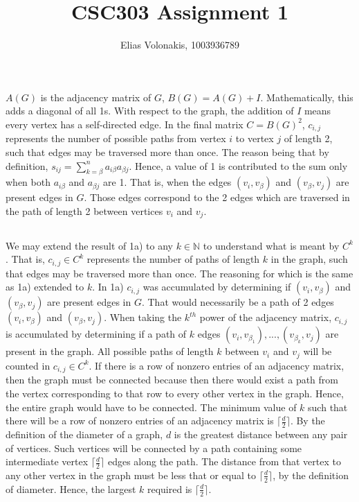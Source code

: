 \documentclass[12pt]{article}
\title{CSC303 Assignment 1}
\author{Elias Volonakis, 1003936789}
\begin{document}
\maketitle

\section{}
\subsection{}
$A(G)$ is the adjacency matrix of $G$, $B(G) = A(G) + I$. Mathematically, this adds a diagonal of all 1s. With respect to the graph, the addition of $I$ means every vertex has a self-directed edge. In the final matrix $C = B(G)^2$, $c_{i,j}$ represents the number of possible paths from vertex $i$ to vertex $j$ of length 2, such that edges may be traversed more than once. The reason being that by definition, $s_{ij} = \sum^n_{k=\beta}{a_{i\beta}a_{\beta j}}$. Hence, a value of 1 is contributed to the sum only when both $a_{i\beta}$ and $a_{\beta j}$ are 1. That is, when the edges $(v_i, v_\beta)$ and $(v_\beta,v_j)$ are present edges in $G$. Those edges correspond to the 2 edges which are traversed in the path of length 2 between vertices $v_i$ and $v_j$.
\subsection{}
We may extend the result of 1a) to any $k \in \mathbb{N}$ to understand what is meant by $C^k$. That is, $c_{i,j} \in C^k$ represents the number of paths of length $k$ in the graph, such that edges may be traversed more than once. The reasoning for which is the same as 1a) extended to $k$. In 1a) $c_{i,j}$ was accumulated by determining if $(v_i, v_\beta)$ and $(v_\beta,v_j)$ are present edges in $G$. That would necessarily be a path of 2 edges $(v_i, v_\beta)$ and $(v_\beta,v_j)$. When taking the $k^{th}$ power of the adjacency matrix, $c_{i,j}$ is accumulated by determining if a path of $k$ edges $(v_i, v_\beta_1), ..., (v_\beta_k,v_j)$ are present in the graph. All possible paths of length $k$ between $v_i$ and $v_j$ will be counted in $c_{i,j} \in C^k$. 
\newline 
\newline 
If there is a row of nonzero entries of an adjacency matrix, then the graph must be connected because then there would exist a path from the vertex corresponding to that row to every other vertex in the graph. Hence, the entire graph would have to be connected. The minimum value of $k$ such that there will be a row of nonzero entries of an adjacency matrix is $\lceil \frac{d}{2} \rceil$. By the definition of the diameter of a graph, $d$ is the greatest distance between any pair of vertices. Such vertices will be connected by a path containing some intermediate vertex $\lceil \frac{d}{2} \rceil$ edges along the path. The distance from that vertex to any other vertex in the graph must be less that or equal to $\lceil \frac{d}{2} \rceil$, by the definition of diameter. Hence, the largest $k$ required is $\lceil \frac{d}{2} \rceil$. 
\end{document}
